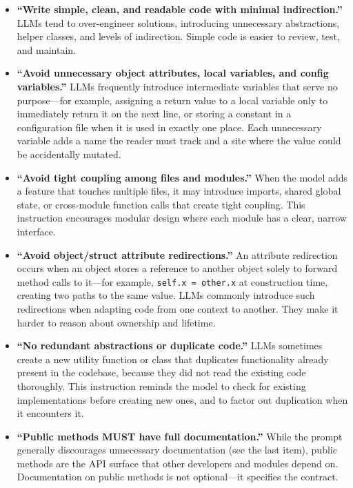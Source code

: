 \documentclass{article}
\begin{document}
\begin{itemize}[nosep]
\item \textbf{``Write simple, clean, and readable code with minimal
  indirection.''}  LLMs tend to over-engineer solutions, introducing
  unnecessary abstractions, helper classes, and levels of indirection.
  Simple code is easier to review, test, and maintain.

\item \textbf{``Avoid unnecessary object attributes, local variables,
  and config variables.''}  LLMs frequently introduce intermediate
  variables that serve no purpose---for example, assigning a return
  value to a local variable only to immediately return it on the next
  line, or storing a constant in a configuration file when it is used
  in exactly one place.  Each unnecessary variable adds a name the
  reader must track and a site where the value could be accidentally
  mutated.

\item \textbf{``Avoid tight coupling among files and modules.''}
  When the model adds a feature that touches multiple files, it may
  introduce imports, shared global state, or cross-module function
  calls that create tight coupling.  This instruction encourages
  modular design where each module has a clear, narrow interface.

\item \textbf{``Avoid object/struct attribute redirections.''}  An
  attribute redirection occurs when an object stores a reference to
  another object solely to forward method calls to it---for example,
  \texttt{self.x = other.x} at construction time, creating two paths
  to the same value.  LLMs commonly introduce such redirections when
  adapting code from one context to another.  They make it harder to
  reason about ownership and lifetime.

\item \textbf{``No redundant abstractions or duplicate code.''}  LLMs
  sometimes create a new utility function or class that duplicates
  functionality already present in the codebase, because they did not
  read the existing code thoroughly.  This instruction reminds the
  model to check for existing implementations before creating new
  ones, and to factor out duplication when it encounters it.

\item \textbf{``Public methods MUST have full documentation.''}  While
  the prompt generally discourages unnecessary documentation (see the
  last item), public methods are the API surface that other developers
  and modules depend on.  Documentation on public methods is not
  optional---it specifies the contract.


\end{itemize}
\end{document}
